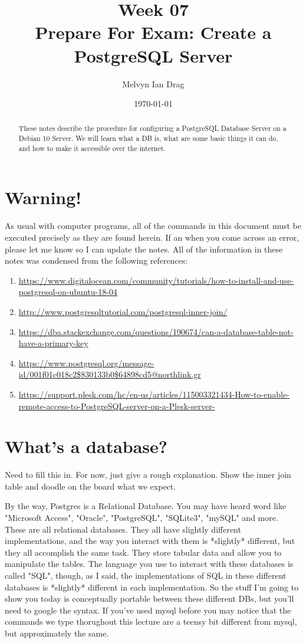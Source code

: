 \documentclass[12pt]{article}
\title{\textbf{Week 07} \\
\Large Prepare For Exam: Create a PostgreSQL Server }
\author{
	Melvyn Ian Drag
}
\date{\today}
\begin{document}
\maketitle

\begin{abstract}
These notes describe the procedure for configuring a PostgreSQL Database Server on a Debian 10 Server. We will learn what a DB is, what are some basic things it can do, and how to make it accessible over the internet.
\end{abstract}

\section{Warning!}
As usual with computer programs, all of the commands in this document must be executed precisely as they are found herein. If an when you come across an error, please let me know so I can update the notes. All of the information in these notes was condensed from the following references:

\begin{enumerate}
\item \url{https://www.digitalocean.com/community/tutorials/how-to-install-and-use-postgresql-on-ubuntu-18-04}
\item \url{http://www.postgresqltutorial.com/postgresql-inner-join/}
\item \url{https://dba.stackexchange.com/questions/190674/can-a-database-table-not-have-a-primary-key}
\item \url{https://www.postgresql.org/message-id/001f01c018c2$830133b0$64898cd5@northlink.gr}
\item \url{https://support.plesk.com/hc/en-us/articles/115003321434-How-to-enable-remote-access-to-PostgreSQL-server-on-a-Plesk-server-}
\end{enumerate}

\section{What's a database?}
Need to fill this in. For now, just give a rough explanation.
Show the inner join table and doodle on the board what we expect.

By the way, Postgres is a Relational Database. You may have heard word like "Microsoft Access", "Oracle", "PostgreSQL", "SQLite3", "mySQL" and more. These are all relational databases. They all have slightly different implementations, and the way you interact with them is *slightly* different, but they all accomplish the same task. They store tabular data and allow you to manipulate the tables. The language you use to interact with these databases is called "SQL", though, as I said, the implementations of SQL in these different databases is *slightly* different in each implementation. So the stuff I'm going to show you today is conceptually portable between these different DBs, but you'll need to google the syntax. If you've used mysql before you may notice that the commands we type thorughout this lecture are a teensy bit different from mysql, but approximately the same.
\end{document}
